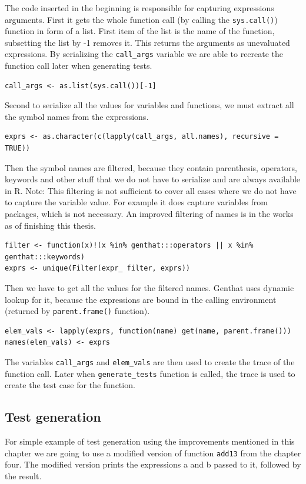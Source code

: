 \documentclass[thesis=B,english]{FITthesis}[2012/10/20]
\begin{document}
The code inserted in the beginning is responsible for capturing expressions arguments. First it gets the whole function call (by calling the \verb|sys.call()|) function in form of a list. First item of the list is the name of the function, subsetting the list by -1 removes it. This returns the arguments as unevaluated expressions. By serializing the \verb|call_args| variable we are able to recreate the function call later when generating tests.

\begin{verbatim}
call_args <- as.list(sys.call())[-1]
\end{verbatim}

Second to serialize all the values for variables and functions, we must extract all the symbol names from the expressions.

\begin{verbatim}
exprs <- as.character(c(lapply(call_args, all.names), recursive = TRUE))
\end{verbatim}

Then the symbol names are filtered, because they contain parenthesis, operators, keywords and other stuff that we do not have to serialize and are always available in R. 
Note: This filtering is not sufficient to cover all cases where we do not have to capture the variable value. For example it does capture variables from packages, which is not necessary. An improved filtering of names is in the works as of finishing this thesis.

\begin{verbatim}
filter <- function(x)!(x %in% genthat:::operators || x %in% genthat:::keywords)
exprs <- unique(Filter(expr_ filter, exprs))
\end{verbatim}

Then we have to get all the values for the filtered names. Genthat uses dynamic lookup for it, because the expressions are bound in the calling environment (returned by \verb|parent.frame()| function).

\begin{verbatim}
elem_vals <- lapply(exprs, function(name) get(name, parent.frame()))
names(elem_vals) <- exprs
\end{verbatim}

The variables \verb|call_args| and \verb|elem_vals| are then used to create the trace of the function call. Later when \verb|generate_tests| function is called, the trace is used to create the test case for the function.

\subsection{Test generation}
For simple example of test generation using the improvements mentioned in this chapter we are going to use a modified version of function \verb|add13| from the chapter four. The modified version prints the expressions a and b passed to it, followed by the result.
\end{document}
